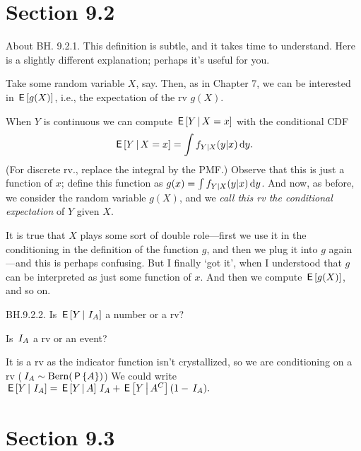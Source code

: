 \section{Section 9.2}
\label{sec:section-9.2}

\begin{remark} About BH. 9.2.1. This definition is subtle, and it takes time to understand.
Here is a slightly different explanation; perhaps it's useful for you.

Take some random variable $X$, say.
Then, as in Chapter 7,  we can be interested in  $\,\mathsf{E}\left[g(X)\right]$, i.e., the expectation of the rv $g(X)$.

When $Y$ is continuous we can compute $\,\mathsf{E}\left[Y \,\middle|\, X=x\right]$ with  the conditional CDF
\begin{align*}
\,\mathsf{E}\left[Y\,\middle|\, X=x \right] =\int f_{Y| X}(y | x) \,\textrm{d}y.
\end{align*}
(For discrete rv., replace the integral by the PMF.)
Observe that this is just a function of $x$; define this function as $g(x) = \int f_{Y| X}(y | x)\,\textrm{d}y$. And now, as before, we consider the random variable $g(X)$, and we  \emph{call this rv the conditional expectation} of $Y$ given $X$.

It is true that $X$ plays some sort of double role---first we use it in the conditioning in the definition of the function $g$, and then we plug it into  $g$ again---and this is perhaps confusing. But I finally `got  it', when I understood that $g$ can be interpreted as just some function of $x$. And then we compute $\,\mathsf{E}\left[g(X)\right]$, and so on.
\end{remark}



\begin{exercise}
BH.9.2.2. Is $\,\mathsf{E}\left[Y\,\middle|\, \,I_{A}\right]$ a number or a rv?
\begin{hint}
  Is $\,I_{A}$ a rv or an event?
\end{hint}
\begin{solution}
  It is a rv as the indicator function isn't crystallized, so we are conditioning on a rv ($\,I_{A} \sim \mathrm{Bern}(\,\mathsf{P}\left\{A\right\})$) We could write $\,\mathsf{E}\left[Y\,\middle|\, \,I_{A}\right] = \,\mathsf{E}\left[Y\,\middle|\, A\right]\,I_{A} + \,\mathsf{E}\left[Y\,\middle|\, A^C\right](1-\,I_{A}).$
\end{solution}
\end{exercise}


\section{Section 9.3}
\label{sec:section-9.3}

